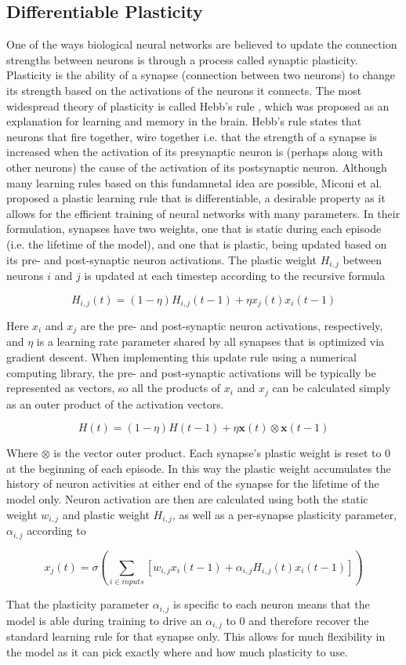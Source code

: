 \subsection*{Differentiable Plasticity}

One of the ways biological neural networks are believed to update the connection strengths between neurons is through a process called synaptic plasticity. Plasticity is the ability of a synapse (connection between two neurons) to change its strength based on the activations of the neurons it connects. The most widespread theory of plasticity is called Hebb's rule \cite{hebb1949rule}, which was proposed as an explanation for learning and memory in the brain. Hebb's rule states that neurons that fire together, wire together i.e. that the strength of a synapse is increased when the activation of its presynaptic neuron is (perhaps along with other neurons) the cause of the activation of its postsynaptic neuron. Although many learning rules based on this fundamnetal idea are possible, Miconi et al.\cite{miconi2018diffplas} proposed a plastic learning rule that is differentiable, a desirable property as it allows for the efficient training of neural networks with many parameters. In their formulation, synapses have two weights, one that is static during each episode (i.e. the lifetime of the model), and one that is plastic, being updated based on its pre- and post-synaptic neuron activations. The plastic weight \(H_{i,j}\) between neurons \(i\) and \(j\) is updated at each timestep according to the recursive formula

\[ H_{i,j}(t) = (1-\eta)H_{i,j}(t-1) + \eta x_j(t)x_i(t-1) \] 

Here \(x_i\) and \(x_j\) are the pre- and post-synaptic neuron activations, respectively, and \(\eta\) is a learning rate parameter shared by all synapses that is optimized via gradient descent. When implementing this update rule using a numerical computing library, the pre- and post-synaptic activations will be typically be represented as vectors, so all the products of \(x_i\) and \(x_j\) can be calculated simply as an outer product of the activation vectors.

\[ H(t) = (1-\eta)H(t-1) + \eta \mathbf{x}(t) \otimes \mathbf{x}(t-1) \]

Where \(\otimes\) is the vector outer product. Each synapse's plastic weight is reset to 0 at the beginning of each episode. In this way the plastic weight accumulates the history of neuron activities at either end of the synapse for the lifetime of the model only. Neuron activation are then are calculated using both the static weight \(w_{i,j}\) and plastic weight \(H_{i,j}\), as well as a per-synapse plasticity parameter, \(\alpha_{i,j}\) according to

\[ x_j(t) = \sigma \left( \sum_{i\in inputs} [ w_{i,j}x_i(t-1) + \alpha_{i,j}H_{i,j}(t)x_i(t-1) ] \right) \]

That the plasticity parameter \(\alpha_{i,j}\) is specific to each neuron means that the model is able during training to drive an \(\alpha_{i,j}\) to 0 and therefore recover the standard learning rule for that synapse only. This allows for much flexibility in the model as it can pick exactly where and how much plasticity to use.
